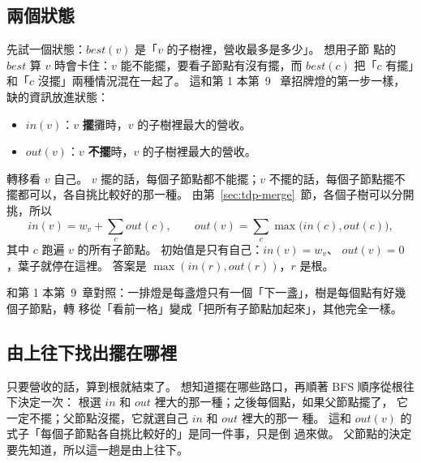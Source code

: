 \subsection{兩個狀態}

先試一個狀態：$\mathit{best}(v)$ 是「$v$ 的子樹裡，營收最多是多少」。 想用子節
點的 $\mathit{best}$ 算 $v$ 時會卡住：$v$ 能不能擺，要看子節點有沒有擺，而
$\mathit{best}(c)$ 把「$c$ 有擺」和「$c$ 沒擺」兩種情況混在一起了。 這和第 1 本第~9
~章招牌燈的第一步一樣，缺的資訊放進狀態：

\begin{itemize}
\item $\mathit{in}(v)$：$v$ \textbf{擺}攤時，$v$ 的子樹裡最大的營收。
\item $\mathit{out}(v)$：$v$ \textbf{不擺}時，$v$ 的子樹裡最大的營收。
\end{itemize}

轉移看 $v$ 自己。 $v$ 擺的話，每個子節點都不能擺；$v$ 不擺的話，每個子節點擺不
擺都可以，各自挑比較好的那一種。 由第~\ref{sec:tdp-merge}~節，各個子樹可以分開
挑，所以
\[
\mathit{in}(v) = w_v + \sum_{c} \mathit{out}(c),\qquad
\mathit{out}(v) = \sum_{c} \max\bigl(\mathit{in}(c), \mathit{out}(c)\bigr),
\]
其中 $c$ 跑遍 $v$ 的所有子節點。 初始值是只有自己：$\mathit{in}(v) = w_v$、
$\mathit{out}(v) = 0$，葉子就停在這裡。 答案是 $\max(\mathit{in}(r),
\mathit{out}(r))$，$r$ 是根。

和第 1 本第~9~章對照：一排燈是每盞燈只有一個「下一盞」，樹是每個點有好幾個子節點，轉
移從「看前一格」變成「把所有子節點加起來」，其他完全一樣。

\subsection{由上往下找出擺在哪裡}

只要營收的話，算到根就結束了。 想知道擺在哪些路口，再順著 BFS 順序從根往下決定一次：
根選 $\mathit{in}$ 和 $\mathit{out}$ 裡大的那一種；之後每個點，如果父節點擺了，
它一定不擺；父節點沒擺，它就選自己 $\mathit{in}$ 和 $\mathit{out}$ 裡大的那一
種。 這和 $\mathit{out}(v)$ 的式子「每個子節點各自挑比較好的」是同一件事，只是倒
過來做。 父節點的決定要先知道，所以這一趟是由上往下。

